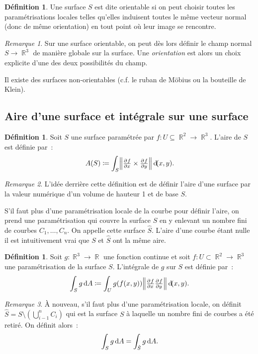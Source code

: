 \documentclass{article}
\DeclareMathOperator{\R}{\mathbb R}
\theoremstyle{definition}
\newtheorem{déf}[thm]{Définition}
\theoremstyle{remark}
\newtheorem*{rmq}{Remarque}
\begin{document}
		\begin{déf} Une surface $S$ est dite orientable si on peut choisir toutes les paramétrisations locales telles qu'elles induisent toutes le même vecteur
		normal (donc de même orientation) en tout point où leur image se rencontre.
		\end{déf}

		\begin{rmq} Sur une surface orientable, on peut dès lors définir le champ normal $S \to \R^3$ de manière globale sur la surface. Une \emph{orientation}
		est alors un choix explicite d'une des deux possibilités du champ.

		Il existe des surfaces non-orientables (c.f. le ruban de Möbius ou la bouteille de Klein).
		\end{rmq}

	\subsection{Aire d'une surface et intégrale sur une surface}
		\begin{déf} Soit $S$ une surface paramétrée par $f : U \subseteq \R^2 \to \R^3$. L'aire de $S$ est définie par~:
		\[A(S) \coloneqq \int_S \norm{\pd fx \times \pd fy}\dif (x, y).\]
		\end{déf}

		\begin{rmq} L'idée derrière cette définition est de définir l'aire d'une surface par la valeur numérique d'un volume de hauteur 1 et de base $S$.
		\end{rmq}

		S'il faut plus d'une paramétrisation locale de la courbe pour définir l'aire, on prend une paramétrisation qui couvre la surface $S$ en y enlevant
		un nombre fini de courbes $C_1, \dotsc, C_n$. On appelle cette surface $\hat S$. L'aire d'une courbe étant nulle il est intuitivement vrai que $S$ et
		$\hat S$ ont la même aire.

		\begin{déf} Soit $g : \R^3 \to \R$ une fonction continue et soit $f : U \subset \R^2 \to \R^3$ une paramétrisation de la surface $S$. L'intégrale
		de $g$ sur $S$ est définie par~:
		\[\int_Sg\dif A \coloneqq \int_U g(f(x, y))\norm{\pd fx \pd fy}\dif (x, y).\]
		\end{déf}

		\begin{rmq} À nouveau, s'il faut plus d'une paramétrisation locale, on définit $\widehat S = S \setminus (\bigcup_{i-1}^nC_i)$ qui est la surface
		$S$ à laquelle un nombre fini de courbes a été retiré. On définit alors~:
		\[\int_S g\dif A = \int_{\hat S}g \dif A.\]
		\end{rmq}
\end{document}
